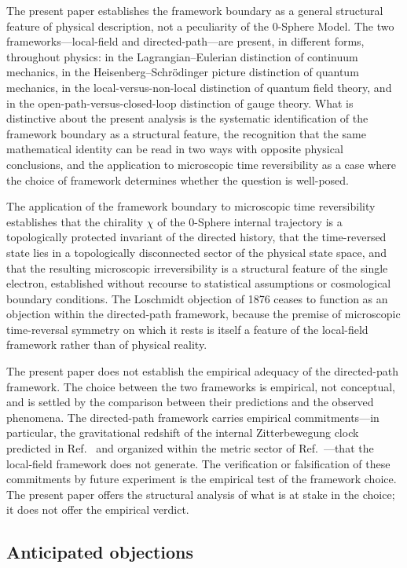 \documentclass[%
 reprint, amsmath,amssymb, aps, prb, ]{revtex4-2}
\numberwithin{equation}{section}
\begin{document}
The present paper establishes the framework boundary as a general structural feature of physical description, not a peculiarity of the 0-Sphere Model. The two frameworks---local-field and directed-path---are present, in different forms, throughout physics: in the Lagrangian--Eulerian distinction of continuum mechanics, in the Heisenberg--Schr\"odinger picture distinction of quantum mechanics, in the local-versus-non-local distinction of quantum field theory, and in the open-path-versus-closed-loop distinction of gauge theory. What is distinctive about the present analysis is the systematic identification of the framework boundary as a structural feature, the recognition that the same mathematical identity can be read in two ways with opposite physical conclusions, and the application to microscopic time reversibility as a case where the choice of framework determines whether the question is well-posed.

The application of the framework boundary to microscopic time reversibility establishes that the chirality $\chi$ of the 0-Sphere internal trajectory is a topologically protected invariant of the directed history, that the time-reversed state lies in a topologically disconnected sector of the physical state space, and that the resulting microscopic irreversibility is a structural feature of the single electron, established without recourse to statistical assumptions or cosmological boundary conditions. The Loschmidt objection of 1876 ceases to function as an objection within the directed-path framework, because the premise of microscopic time-reversal symmetry on which it rests is itself a feature of the local-field framework rather than of physical reality.

The present paper does not establish the empirical adequacy of the directed-path framework. The choice between the two frameworks is empirical, not conceptual, and is settled by the comparison between their predictions and the observed phenomena. The directed-path framework carries empirical commitments---in particular, the gravitational redshift of the internal Zitterbewegung clock predicted in Ref.~\cite{hanamura22} and organized within the metric sector of Ref.~\cite{hanamura55}---that the local-field framework does not generate. The verification or falsification of these commitments by future experiment is the empirical test of the framework choice. The present paper offers the structural analysis of what is at stake in the choice; it does not offer the empirical verdict.

\subsection{Anticipated objections}
\label{sec:objections}
\end{document}
